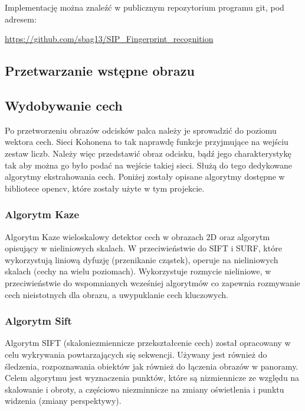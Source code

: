 \documentclass[12pt, notitlepage]{article}
\begin{document}
Implementację można znaleźć w publicznym repozytorium programu git, pod adresem:
\begin{center}
    \url{https://github.com/sbag13/SIP_Fingerprint_recognition}
\end{center}

\subsection{Przetwarzanie wstępne obrazu}\label{sec:preprocesing}

\subsection{Wydobywanie cech}\label{sec:extraction}

Po przetworzeniu obrazów odcisków palca należy je sprowadzić do poziomu wektora cech. Sieci Kohonena to tak naprawdę funkcje przyjmujące na wejściu zestaw liczb. Należy więc przedstawić obraz odcisku, bądź jego charakterystykę tak aby można go było podać na wejście takiej sieci. Służą do tego dedykowane algorytmy ekstrahowania cech. Poniżej zostały opisane algorytmy dostępne w bibliotece opencv\cite{opencv}, które zostały użyte w tym projekcie.

\subsubsection{Algorytm Kaze}

Algorytm Kaze wieloskalowy detektor cech w obrazach 2D oraz algorytm opisujący w nieliniowych skalach. W przeciwieństwie do SIFT i SURF, które wykorzystują liniową dyfuzję (przenikanie cząstek), operuje na nieliniowych skalach (cechy na wielu poziomach). Wykorzystuje rozmycie nieliniowe, w przeciwieństwie do wspomnianych wcześniej algorytmów co zapewnia rozmywanie cech nieistotnych dla obrazu, a uwypuklanie cech kluczowych.

\subsubsection{Algorytm Sift}

Algorytm SIFT (skaloniezmiennicze przekształcenie cech) został opracowany w celu wykrywania powtarzających się sekwencji. Używany jest również do śledzenia, rozpoznawania obiektów jak również do łączenia obrazów w panoramy. Celem algorytmu jest wyznaczenia punktów, które są nizmiennicze ze względu na skalowanie i obroty, a częściowo niezminnicze na zmiany oświetlenia i punktu widzenia (zmiany perspektywy).
\end{document}
